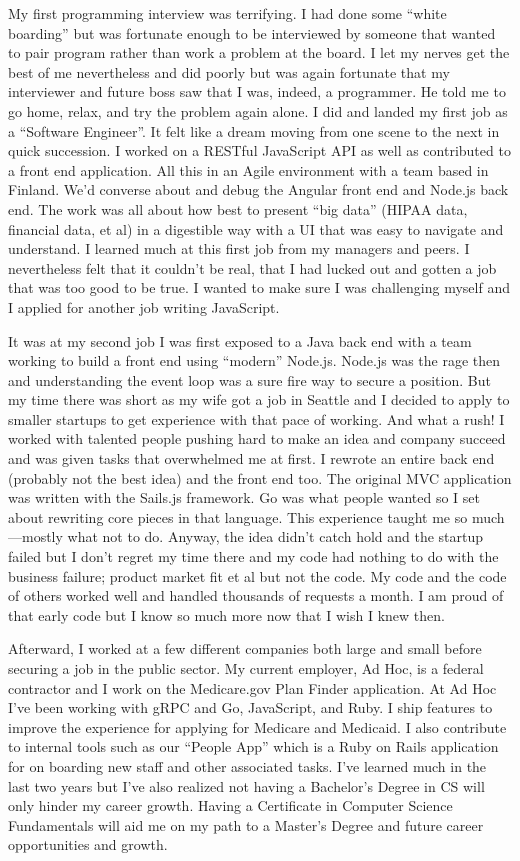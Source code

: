 \documentclass[12pt]{article}
\begin{document}
My first programming interview was terrifying. I had done some ``white boarding'' but was fortunate enough to be interviewed by someone that wanted to pair program rather than work a problem at the board. I let my nerves get the best of me nevertheless and did poorly but was again fortunate that my interviewer and future boss saw that I was, indeed, a programmer. He told me to go home, relax, and try the problem again alone. I did and landed my first job as a ``Software Engineer''. It felt like a dream moving from one scene to the next in quick succession. I worked on a RESTful JavaScript API as well as contributed to a front end application. All this in an Agile environment with a team based in Finland. We'd converse about and debug the Angular front end and Node.js back end. The work was all about how best to present ``big data'' (HIPAA data, financial data, et al) in a digestible way with a UI that was easy to navigate and understand. I learned much at this first job from my managers and peers. I nevertheless felt that it couldn't be real, that I had lucked out and gotten a job that was too good to be true. I wanted to make sure I was challenging myself and I applied for another job writing JavaScript.

It was at my second job I was first exposed to a Java back end with a team working to build a front end using ``modern'' Node.js. Node.js was the rage then and understanding the event loop was a sure fire way to secure a position. But my time there was short as my wife got a job in Seattle and I decided to apply to smaller startups to get experience with that pace of working. And what a rush! I worked with talented people pushing hard to make an idea and company succeed and was given tasks that overwhelmed me at first. I rewrote an entire back end (probably not the best idea) and the front end too. The original MVC application was written with the Sails.js framework. Go was what people wanted so I set about rewriting core pieces in that language. This experience taught me so much---mostly what not to do. Anyway, the idea didn't catch hold and the startup failed but I don't regret my time there and my code had nothing to do with the business failure; product market fit et al but not the code. My code and the code of others worked well and handled thousands of requests a month. I am proud of that early code but I know so much more now that I wish I knew then.

Afterward, I worked at a few different companies both large and small before securing a job in the public sector. My current employer, Ad Hoc, is a federal contractor and I work on the Medicare.gov Plan Finder application. At Ad Hoc I've been working with gRPC and Go, JavaScript, and Ruby. I ship features to improve the experience for applying for Medicare and Medicaid. I also contribute to internal tools such as our ``People App'' which is a Ruby on Rails application for on boarding new staff and other associated tasks. I've learned much in the last two years but I've also realized not having a Bachelor's Degree in CS will only hinder my career growth. Having a Certificate in Computer Science Fundamentals will aid me on my path to a Master's Degree and future career opportunities and growth.
\end{document}
